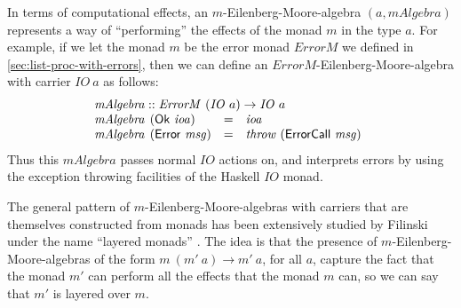 \documentclass{jfp1}
\begin{document}
In terms of computational effects, an $m$-Eilenberg-Moore-algebra $(a,
\mathit{mAlgebra})$ represents a way of ``performing'' the effects of
the monad $m$ in the type $a$. For example, if we let the monad $m$ be
the error monad $\mathit{ErrorM}$ we defined in
\autoref{sec:list-proc-with-errors}, then we can define an
$\mathit{ErrorM}$-Eilenberg-Moore-algebra with carrier $\mathit{IO}~a$
as follows:
\begin{displaymath}
  \begin{array}{l}
    \mathit{mAlgebra} :: \mathit{ErrorM}~(\mathit{IO}~a) \to \mathit{IO}~a \\
    \begin{array}{@{}l@{\hspace{0.4em}}lcl}
      \mathit{mAlgebra}&(\mathsf{Ok}~\mathit{ioa}) & = & \mathit{ioa} \\
      \mathit{mAlgebra}&(\mathsf{Error}~\mathit{msg}) & = & \mathit{throw}~(\mathsf{ErrorCall}~\mathit{msg})
    \end{array}
  \end{array}
\end{displaymath}
Thus this $\mathit{mAlgebra}$ passes normal $\mathit{IO}$ actions on,
and interprets errors by using the exception throwing facilities of
the Haskell $\mathit{IO}$ monad.

The general pattern of $m$-Eilenberg-Moore-algebras with carriers that
are themselves constructed from monads has been extensively studied by
Filinski under the name ``layered monads''
\cite{filinski99representing}. The idea is that the presence of
$m$-Eilenberg-Moore-algebras of the form $m~(m'~a) \to m'~a$, for all
$a$, capture the fact that the monad $m'$ can perform all the effects
that the monad $m$ can, so we can say that $m'$ is layered over $m$.
\end{document}
